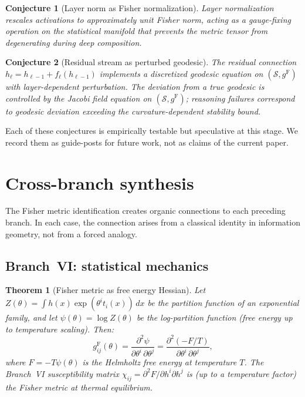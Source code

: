 \documentclass[11pt]{article}
\newcommand{\gF}{g^{\mathrm{F}}}
\newtheorem{theorem}{Theorem}
\newtheorem{conjecture}{Conjecture}
\theoremstyle{remark}
\begin{document}
\begin{conjecture}[Layer norm as Fisher normalization]
\label{conj:layer-norm}
Layer normalization rescales activations to approximately unit Fisher norm,
acting as a gauge-fixing operation on the statistical manifold that prevents
the metric tensor from degenerating during deep composition.
\end{conjecture}

\begin{conjecture}[Residual stream as perturbed geodesic]
\label{conj:residual}
The residual connection $h_\ell = h_{\ell-1} + f_\ell(h_{\ell-1})$
implements a discretized geodesic equation on $(\mathcal{S}, \gF)$ with
layer-dependent perturbation.  The deviation from a true geodesic is
controlled by the Jacobi field equation on $(\mathcal{S}, \gF)$; reasoning
failures correspond to geodesic deviation exceeding the curvature-dependent
stability bound.
\end{conjecture}

Each of these conjectures is empirically testable but speculative at this
stage.  We record them as guide-posts for future work, not as claims of the
current paper.

\section{Cross-branch synthesis}
\label{sec:cross-branch}

The Fisher metric identification creates organic connections to each preceding
branch.  In each case, the connection arises from a classical identity in
information geometry, not from a forced analogy.

\subsection{Branch~VI: statistical mechanics}

\begin{theorem}[Fisher metric as free energy Hessian]
\label{thm:fisher-free-energy}
Let $Z(\theta) = \int h(x) \exp(\theta^i t_i(x))\, dx$ be the partition
function of an exponential family, and let
$\psi(\theta) = \log Z(\theta)$ be the log-partition function (free energy up
to temperature scaling).  Then:
\begin{equation}\label{eq:fisher-free-energy}
\gF_{ij}(\theta)
= \frac{\partial^2 \psi}{\partial\theta^i\, \partial\theta^j}
= \frac{\partial^2 (-F / T)}{\partial\theta^i\, \partial\theta^j},
\end{equation}
where $F = -T \psi(\theta)$ is the Helmholtz free energy at temperature $T$.
The Branch~VI susceptibility matrix
$\chi_{ij} = \partial^2 F / \partial h^i \partial h^j$ is (up to a
temperature factor) the Fisher metric at thermal equilibrium.
\end{theorem}
\end{document}

